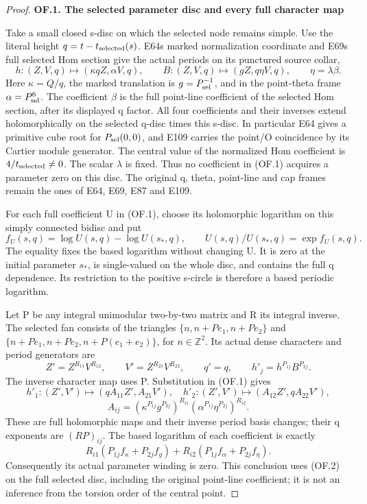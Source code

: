 \begin{proof}
\par

\medskip\noindent\textbf{OF.1. The selected parameter disc and every full character map}

\par\nobreak

Take a small closed s-disc on which the selected node remains simple.
Use the literal height \(q=t-t_{\rm selected}(s)\). E64\textquotesingle s marked
normalization coordinate and E69\textquotesingle s full selected Hom section give
the actual periods on its punctured source collar,
\[
 h:(Z,V,q)\longmapsto(\kappa qZ,\alpha V,q),\qquad
 B:(Z,V,q)\longmapsto(gZ,q\eta V,q),
 \qquad \eta=\lambda\beta.                         \tag{OF.1}
\]
Here \(\kappa=Q/q\), the marked translation is
\(g=P_{\rm sel}^{-1}\), and in the point-theta frame
\(\alpha=P_{\rm sel}^{6}\). The coefficient \(\beta\) is the
full point-line coefficient of the selected Hom section, after its
displayed q factor. All four coefficients and their inverses extend
holomorphically on the selected q-disc times this s-disc. In
particular E64 gives a primitive cube root for \(P_{\rm sel}(0,0)\),
and E109 carries the point/O coincidence by its Cartier module
generator. The central value of the normalized Hom coefficient is
\(4/t_{\rm selected}\ne0\). The scalar \(\lambda\) is fixed.
Thus no coefficient in (OF.1) acquires a parameter zero on this
disc. The original q, theta, point-line and cap frames remain the
ones of E64, E69, E87 and E109.

For each full coefficient U in (OF.1), choose its holomorphic
logarithm on this simply connected bidisc and put
\[
 f_U(s,q)=\log U(s,q)-\log U(s_*,q),
 \qquad U(s,q)/U(s_*,q)=\exp f_U(s,q).              \tag{OF.2}
\]
The equality fixes the based logarithm without changing U. It is
zero at the initial parameter \(s_*\), is single-valued on the
whole disc, and contains the full q dependence. Its restriction to
the positive s-circle is therefore a based periodic logarithm.

Let P be any integral unimodular two-by-two matrix and R its
integral inverse. The selected fan consists of the triangles
\(\{n,n+Pe_1,n+Pe_2\}\) and
\(\{n+Pe_1,n+Pe_2,n+P(e_1+e_2)\}\), for \(n\in\mathbb Z^2\).
Its actual dense characters and period generators are
\[
 Z'=Z^{R_{11}}V^{R_{12}},\qquad
 V'=Z^{R_{21}}V^{R_{22}},\qquad q'=q,
 \qquad h'_j=h^{P_{1j}}B^{P_{2j}}.                \tag{OF.3}
\]
The inverse character map uses P. Substitution in (OF.1) gives
\[
 h'_1:(Z',V')\mapsto(qA_{11}Z',A_{21}V'),\quad
 h'_2:(Z',V')\mapsto(A_{12}Z',qA_{22}V'),
\]
\[
 A_{ij}=(\kappa^{P_{1j}}g^{P_{2j}})^{R_{i1}}
        (\alpha^{P_{1j}}\eta^{P_{2j}})^{R_{i2}}.  \tag{OF.4}
\]
These are full holomorphic maps and their inverse period basis
changes; their q exponents are \((RP)_{ij}\). The based logarithm
of each coefficient is exactly
\[
 R_{i1}(P_{1j}f_\kappa+P_{2j}f_g)
 +R_{i2}(P_{1j}f_\alpha+P_{2j}f_\eta).           \tag{OF.5}
\]
Consequently its actual parameter winding is zero. This conclusion
uses (OF.2) on the full selected disc, including the original
point-line coefficient; it is not an inference from the torsion
order of the central point.


\end{proof}
